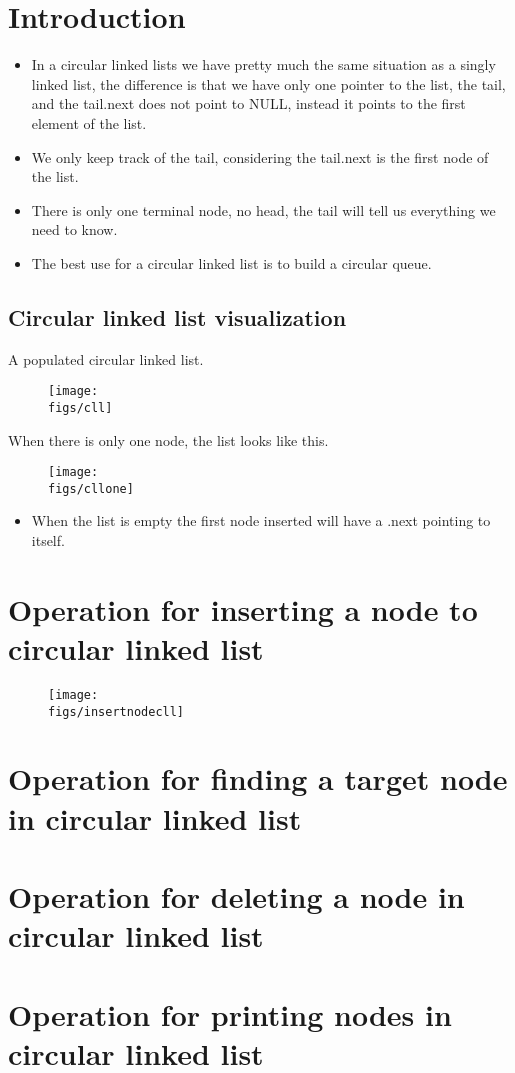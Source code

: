 \section{Introduction}
\begin{itemize}
    \item In a circular linked lists we have pretty much the same situation as a singly linked list, the difference is that we have only one pointer to the list, the tail, and the tail.next does not point to NULL, instead it points to the first element of the list. 
    \item We only keep track of the tail, considering the tail.next is the first node of the list.
    \item There is only one terminal node, no head, the tail will tell us everything we need to know. 
    \item The best use for a circular linked list is to build a circular queue. 
\end{itemize}

\subsection{Circular linked list visualization}
A populated circular linked list.
\begin{figure}[H]
    \centering
    \texttt{[image: \\figs/cll]} 
\end{figure}
When there is only one node, the list looks like this.
\begin{figure}[H]
    \centering
    \texttt{[image: \\figs/cllone]} 
\end{figure}
\begin{itemize}
    \item When the list is empty the first node inserted will have a .next pointing to itself.
\end{itemize}

\section{Operation for inserting a node to circular linked list}
\begin{figure}[H]
    \centering
    \texttt{[image: \\figs/insertnodecll]}
\end{figure}

\section{Operation for finding a target node in circular linked list}


\section{Operation for deleting a node in circular linked list}


\section{Operation for printing nodes in circular linked list}  

